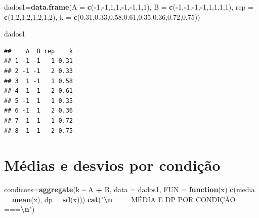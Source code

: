 \documentclass[
]{article}
\newenvironment{Shaded}{\begin{snugshade}}{\end{snugshade}}
\newcommand{\AttributeTok}[1]{\textcolor[rgb]{0.13,0.29,0.53}{#1}}
\newcommand{\ControlFlowTok}[1]{\textcolor[rgb]{0.13,0.29,0.53}{\textbf{#1}}}
\newcommand{\DecValTok}[1]{\textcolor[rgb]{0.00,0.00,0.81}{#1}}
\newcommand{\FloatTok}[1]{\textcolor[rgb]{0.00,0.00,0.81}{#1}}
\newcommand{\FunctionTok}[1]{\textcolor[rgb]{0.13,0.29,0.53}{\textbf{#1}}}
\newcommand{\NormalTok}[1]{#1}
\newcommand{\OtherTok}[1]{\textcolor[rgb]{0.56,0.35,0.01}{#1}}
\newcommand{\SpecialCharTok}[1]{\textcolor[rgb]{0.81,0.36,0.00}{\textbf{#1}}}
\newcommand{\StringTok}[1]{\textcolor[rgb]{0.31,0.60,0.02}{#1}}
\begin{document}
\begin{Shaded}
\begin{Highlighting}[]
\NormalTok{dados1}\OtherTok{=}\FunctionTok{data.frame}\NormalTok{(}\AttributeTok{A =} \FunctionTok{c}\NormalTok{(}\SpecialCharTok{{-}}\DecValTok{1}\NormalTok{,}\SpecialCharTok{{-}}\DecValTok{1}\NormalTok{,}\DecValTok{1}\NormalTok{,}\DecValTok{1}\NormalTok{,}\SpecialCharTok{{-}}\DecValTok{1}\NormalTok{,}\SpecialCharTok{{-}}\DecValTok{1}\NormalTok{,}\DecValTok{1}\NormalTok{,}\DecValTok{1}\NormalTok{),}
                    \AttributeTok{B =} \FunctionTok{c}\NormalTok{(}\SpecialCharTok{{-}}\DecValTok{1}\NormalTok{,}\SpecialCharTok{{-}}\DecValTok{1}\NormalTok{,}\SpecialCharTok{{-}}\DecValTok{1}\NormalTok{,}\SpecialCharTok{{-}}\DecValTok{1}\NormalTok{,}\DecValTok{1}\NormalTok{,}\DecValTok{1}\NormalTok{,}\DecValTok{1}\NormalTok{,}\DecValTok{1}\NormalTok{), }
                  \AttributeTok{rep =} \FunctionTok{c}\NormalTok{(}\DecValTok{1}\NormalTok{,}\DecValTok{2}\NormalTok{,}\DecValTok{1}\NormalTok{,}\DecValTok{2}\NormalTok{,}\DecValTok{1}\NormalTok{,}\DecValTok{2}\NormalTok{,}\DecValTok{1}\NormalTok{,}\DecValTok{2}\NormalTok{),}
                    \AttributeTok{k =} \FunctionTok{c}\NormalTok{(}\FloatTok{0.31}\NormalTok{,}\FloatTok{0.33}\NormalTok{,}\FloatTok{0.58}\NormalTok{,}\FloatTok{0.61}\NormalTok{,}\FloatTok{0.35}\NormalTok{,}\FloatTok{0.36}\NormalTok{,}\FloatTok{0.72}\NormalTok{,}\FloatTok{0.75}\NormalTok{))}

\NormalTok{dados1}
\end{Highlighting}
\end{Shaded}

\begin{verbatim}
##    A  B rep    k
## 1 -1 -1   1 0.31
## 2 -1 -1   2 0.33
## 3  1 -1   1 0.58
## 4  1 -1   2 0.61
## 5 -1  1   1 0.35
## 6 -1  1   2 0.36
## 7  1  1   1 0.72
## 8  1  1   2 0.75
\end{verbatim}

\section{Médias e desvios por
condição}\label{muxe9dias-e-desvios-por-condiuxe7uxe3o}

\begin{Shaded}
\begin{Highlighting}[]
\NormalTok{condicoes}\OtherTok{=}\FunctionTok{aggregate}\NormalTok{(k }\SpecialCharTok{\textasciitilde{}}\NormalTok{ A }\SpecialCharTok{+}\NormalTok{ B, }\AttributeTok{data =}\NormalTok{ dados1,}
                       \AttributeTok{FUN =} \ControlFlowTok{function}\NormalTok{(x) }\FunctionTok{c}\NormalTok{(}\AttributeTok{media =} \FunctionTok{mean}\NormalTok{(x), }\AttributeTok{dp =} \FunctionTok{sd}\NormalTok{(x)))}
\FunctionTok{cat}\NormalTok{(}\StringTok{"}\SpecialCharTok{\textbackslash{}n}\StringTok{=== MÉDIA E DP POR CONDIÇÃO ===}\SpecialCharTok{\textbackslash{}n}\StringTok{"}\NormalTok{)}
\end{Highlighting}
\end{Shaded}
\end{document}
